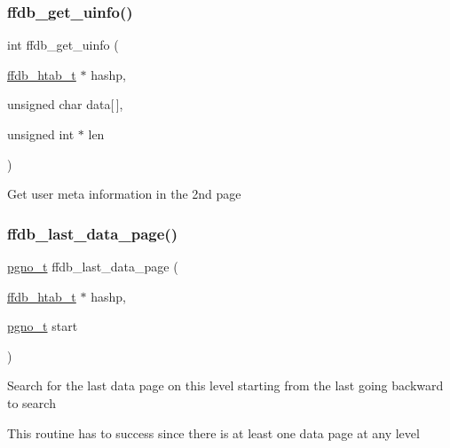 \subsubsection{\texorpdfstring{ffdb\_get\_uinfo()}{ffdb\_get\_uinfo()}}
{\footnotesize\ttfamily int ffdb\+\_\+get\+\_\+uinfo (\begin{DoxyParamCaption}\item[{\mbox{\hyperlink{adat-devel_2other__libs_2filedb_2filehash_2ffdb__hash_8h_ae592010ed2bedc975d3cc0b7d074b9d1}{ffdb\+\_\+htab\+\_\+t}} $\ast$}]{hashp,  }\item[{unsigned char}]{data\mbox{[}$\,$\mbox{]},  }\item[{unsigned int $\ast$}]{len }\end{DoxyParamCaption})}

Get user meta information in the 2nd page \mbox{\label{adat-devel_2other__libs_2filedb_2filehash_2ffdb__page_8c_ab18204b922b3c1431b8bcbd71fbe19d7}} 
\subsubsection{\texorpdfstring{ffdb\_last\_data\_page()}{ffdb\_last\_data\_page()}}
{\footnotesize\ttfamily \mbox{\hyperlink{adat-devel_2other__libs_2filedb_2filehash_2ffdb__db_8h_a000813331643d38481142bcce7de1501}{pgno\+\_\+t}} ffdb\+\_\+last\+\_\+data\+\_\+page (\begin{DoxyParamCaption}\item[{\mbox{\hyperlink{adat-devel_2other__libs_2filedb_2filehash_2ffdb__hash_8h_ae592010ed2bedc975d3cc0b7d074b9d1}{ffdb\+\_\+htab\+\_\+t}} $\ast$}]{hashp,  }\item[{\mbox{\hyperlink{adat-devel_2other__libs_2filedb_2filehash_2ffdb__db_8h_a000813331643d38481142bcce7de1501}{pgno\+\_\+t}}}]{start }\end{DoxyParamCaption})}

Search for the last data page on this level starting from the last going backward to search

This routine has to success since there is at least one data page at any level \mbox{\label{adat-devel_2other__libs_2filedb_2filehash_2ffdb__page_8c_a3781c690210dc9ff030bca63ca76b521}} 
